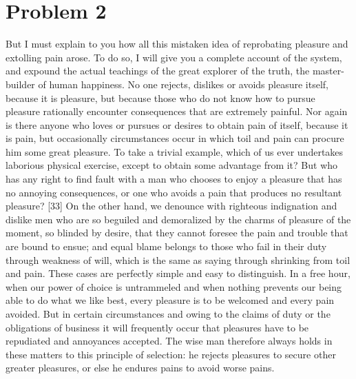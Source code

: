 \documentclass[letterpaper]{article}
\begin{document}
\section*{Problem 2}
\begin{ddanger}
[32] But I must explain to you how all this mistaken idea of reprobating pleasure and extolling pain arose. To do so, I will give you a complete account of the system, and expound the actual teachings of the great explorer of the truth, the master-builder of human happiness. No one rejects, dislikes or avoids pleasure itself, because it is pleasure, but because those who do not know how to pursue pleasure rationally encounter consequences that are extremely painful. Nor again is there anyone who loves or pursues or desires to obtain pain of itself, because it is pain, but occasionally circumstances occur in which toil and pain can procure him some great pleasure. To take a trivial example, which of us ever undertakes laborious physical exercise, except to obtain some advantage from it? But who has any right to find fault with a man who chooses to enjoy a pleasure that has no annoying consequences, or one who avoids a pain that produces no resultant pleasure? [33] On the other hand, we denounce with righteous indignation and dislike men who are so beguiled and demoralized by the charms of pleasure of the moment, so blinded by desire, that they cannot foresee the pain and trouble that are bound to ensue; and equal blame belongs to those who fail in their duty through weakness of will, which is the same as saying through shrinking from toil and pain. These cases are perfectly simple and easy to distinguish. In a free hour, when our power of choice is untrammeled and when nothing prevents our being able to do what we like best, every pleasure is to be welcomed and every pain avoided. But in certain circumstances and owing to the claims of duty or the obligations of business it will frequently occur that pleasures have to be repudiated and annoyances accepted. The wise man therefore always holds in these matters to this principle of selection: he rejects pleasures to secure other greater pleasures, or else he endures pains to avoid worse pains.~\cite{book:lorem_ipsum}
\hfill{}
\end{ddanger}

\printbibliography
\end{document}
